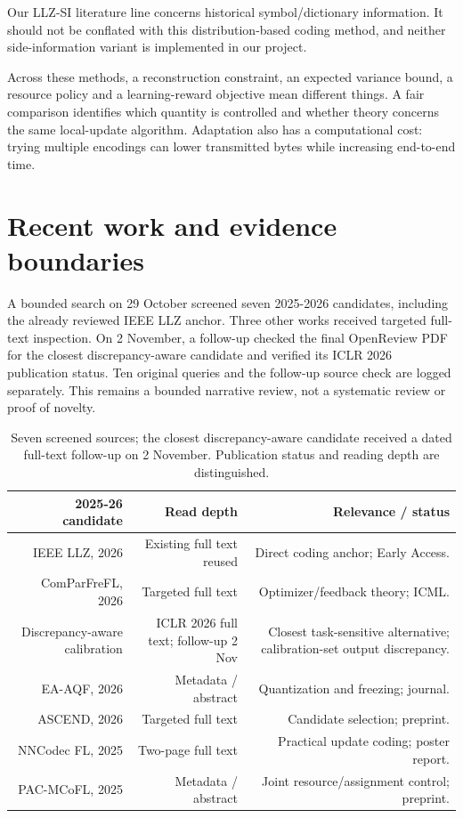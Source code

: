 \documentclass[11pt,a4paper]{article}
\begin{document}
Our LLZ-SI literature line concerns historical symbol/dictionary information. It should not be conflated with this distribution-based coding method, and neither side-information variant is implemented in our project.

Across these methods, a reconstruction constraint, an expected variance bound, a resource policy and a learning-reward objective mean different things. A fair comparison identifies which quantity is controlled and whether theory concerns the same local-update algorithm. Adaptation also has a computational cost: trying multiple encodings can lower transmitted bytes while increasing end-to-end time.

\section{Recent work and evidence boundaries}

A bounded search on 29 October screened seven 2025-2026 candidates, including the already reviewed IEEE LLZ anchor. Three other works received targeted full-text inspection. On 2 November, a follow-up checked the final OpenReview PDF for the closest discrepancy-aware candidate and verified its ICLR 2026 publication status. Ten original queries and the follow-up source check are logged separately. This remains a bounded narrative review, not a systematic review or proof of novelty.

\begin{table}[htbp]
\centering
\small
\begin{tabularx}{\textwidth}{R{1.17000}R{0.72000}R{1.11000}}
\toprule
\textbf{2025-26 candidate} & \textbf{Read depth} & \textbf{Relevance / status} \\\midrule
IEEE LLZ, 2026 & Existing full text reused & Direct coding anchor; Early Access. \\
ComParFreFL, 2026 & Targeted full text & Optimizer/feedback theory; ICML. \\
Discrepancy-aware calibration & ICLR 2026 full text; follow-up 2 Nov & Closest task-sensitive alternative; calibration-set output discrepancy. \parencite{wang2026discrepancy} \\
EA-AQF, 2026 & Metadata / abstract & Quantization and freezing; journal. \\
ASCEND, 2026 & Targeted full text & Candidate selection; preprint. \\
NNCodec FL, 2025 & Two-page full text & Practical update coding; poster report. \\
PAC-MCoFL, 2025 & Metadata / abstract & Joint resource/assignment control; preprint. \\
\bottomrule
\end{tabularx}
\caption{Seven screened sources; the closest discrepancy-aware candidate received a dated full-text follow-up on 2 November. Publication status and reading depth are distinguished.}
\label{tab:recent}
\end{table}
\end{document}
